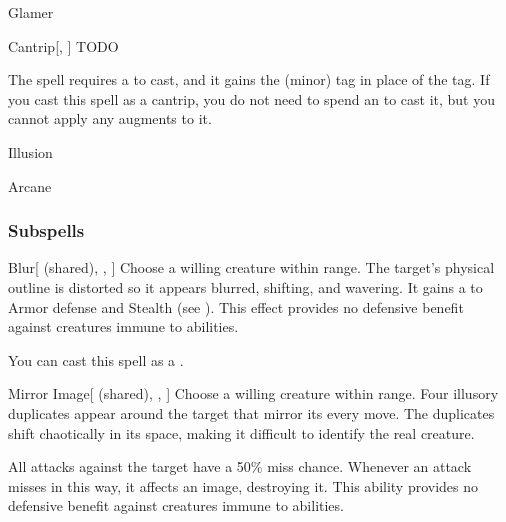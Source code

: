 \newpage
\begin{spellsection}{Glamer}

\begin{spellheader}
\spelldesc{}
\end{spellheader}


\begin{ability}{Cantrip}[, ]
TODO
\end{ability}



 The spell requires a  to cast, and it gains the  (minor) tag in place of the  tag. If you cast this spell as a cantrip,
you do not need to spend an  to cast it,
but you cannot apply any augments to it.


 Illusion

 Arcane
\end{spellsection}


\subsubsection{Subspells}


\begin{ability}[\nth{1}]{Blur}[ (shared), , ]
Choose a willing creature within \rngmed range.
The target's physical outline is distorted so it appears blurred, shifting, and wavering.
It gains a   to Armor defense and Stealth (see ).
This effect provides no defensive benefit against creatures immune to  abilities.

You can cast this spell as a .
\end{ability}
\vspace{0.25em}


\begin{ability}[\nth{2}]{Mirror Image}[ (shared), , ]
Choose a willing creature within \rngclose range.
Four illusory duplicates appear around the target that mirror its every move.
The duplicates shift chaotically in its space, making it difficult to identify the real creature.

All  attacks against the target have a 50\% miss chance.
Whenever an attack misses in this way, it affects an image, destroying it.
This ability provides no defensive benefit against creatures immune to  abilities.
\end{ability}
\vspace{0.25em}


